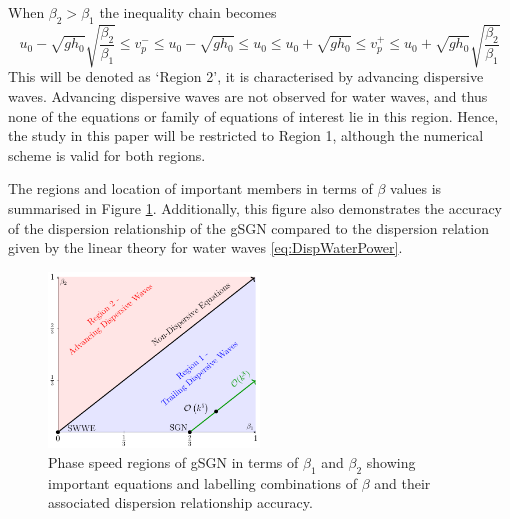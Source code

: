 \documentclass[10pt]{elsarticle}
\begin{document}
When ${\beta_2} >  \beta_1 $ the inequality chain becomes
\begin{equation}
u_0 - \sqrt{gh_0} \sqrt{\dfrac{\beta_2}{ \beta_1}} \le v^-_p \le u_0 -  \sqrt{gh_0} \le  u_0 \le u_0 + \sqrt{gh_0} \le   v^+_p  \le u_0 +  \sqrt{gh_0} \sqrt{\dfrac{\beta_2}{ \beta_1}}
\label{eq:wavespeedbound2}
\end{equation}
This will be denoted as `Region 2', it is characterised by advancing dispersive waves. Advancing dispersive waves are not observed for water waves, and thus none of the equations or family of equations of interest lie in this region. Hence, the study in this paper will be restricted to Region 1, although the numerical scheme is valid for both regions.   

The regions and location of important members in terms of $\beta$ values is summarised in Figure \ref{Fig:WaveSpeedReg}. Additionally, this figure also demonstrates the accuracy of the dispersion relationship of the gSGN compared to the dispersion relation given by the linear theory for water waves \eqref{eq:DispWaterPower}.
%
\begin{figure}
	\centering
	\includegraphics[width=0.5\textwidth]{./Figures/Explanation/BetaPlotAll.pdf}
	\caption{Phase speed regions of gSGN in terms of $\beta_1$ and $\beta_2$ showing important equations and labelling combinations of $\beta$ and their associated dispersion relationship accuracy.}
	\label{Fig:WaveSpeedReg}
\end{figure}


\end{document}
